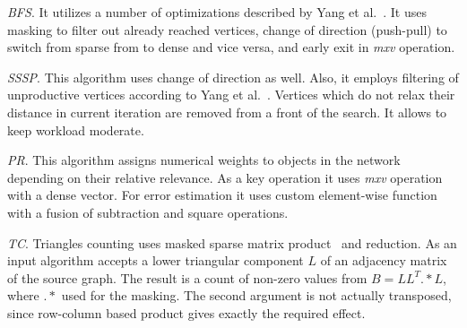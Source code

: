 \textit{BFS}. It utilizes a number of optimizations described by Yang et al.~\cite{https://doi.org/10.48550/arxiv.1804.03327:pushpull}. It uses masking to filter out already reached vertices, change of direction (push-pull) to switch from sparse from to dense and vice versa, and early exit in \textit{mxv} operation.

\textit{SSSP}. This algorithm uses change of direction as well. Also, it employs filtering of unproductive vertices according to Yang et al.~\cite{yang2019graphblast}. Vertices which do not relax their distance in current iteration are removed from a front of the search. It allows to keep workload moderate. 

\textit{PR}. This algorithm assigns numerical weights to objects in the network depending on their relative relevance. As a key operation it uses \textit{mxv} operation with a dense vector. For error estimation it uses custom element-wise function with a fusion of subtraction and square operations.  

\textit{TC}. Triangles counting uses masked sparse matrix product~\cite{yang2019graphblast} and reduction. As an input algorithm accepts a lower triangular component $L$ of an adjacency matrix of the source graph. The result is a count of non-zero values from $B = LL^T .* L$, where $.*$ used for the masking. The second argument is not actually transposed, since row-column based product gives exactly the required effect.